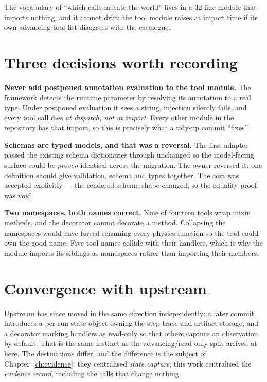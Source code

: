 \documentclass[11pt,a4paper]{report}
\newcommand{\keyrule}[1]{\textbf{\textcolor{acc}{#1}}}
\begin{document}
The vocabulary of ``which calls mutate the world'' lives in a 32-line module
that imports nothing, and it cannot drift: the tool module raises at import time
if its own advancing-tool list disagrees with the catalogue.

\section{Three decisions worth recording}

\keyrule{Never add postponed annotation evaluation to the tool module.} The
framework detects the runtime parameter by resolving its annotation to a real
type. Under postponed evaluation it sees a string, injection silently fails, and
every tool call dies \emph{at dispatch, not at import}. Every other module in
the repository has that import, so this is precisely what a tidy-up commit
``fixes''.

\keyrule{Schemas are typed models, and that was a reversal.} The first adapter
passed the existing schema dictionaries through unchanged so the model-facing
surface could be \emph{proven} identical across the migration. The owner
reversed it: one definition should give validation, schema and types together.
The cost was accepted explicitly --- the rendered schema shape changed, so the
equality proof was void.

\keyrule{Two namespaces, both names correct.} Nine of fourteen tools wrap mixin
methods, and the decorator cannot decorate a method. Collapsing the namespaces
would have forced renaming every physics function so the tool could own the good
name. Five tool names collide with their handlers, which is why the module
imports its siblings as namespaces rather than importing their members.

\section{Convergence with upstream}

Upstream has since moved in the same direction independently: a later commit
introduces a per-run state object owning the step trace and artifact storage,
and a decorator marking handlers as read-only so that others capture an
observation by default. That is the same instinct as the advancing/read-only
split arrived at here. The destinations differ, and the difference is the
subject of Chapter~\ref{ch:evidence}: they centralised \emph{state capture}; this work
centralised the \emph{evidence record}, including the calls that change nothing.
\end{document}

